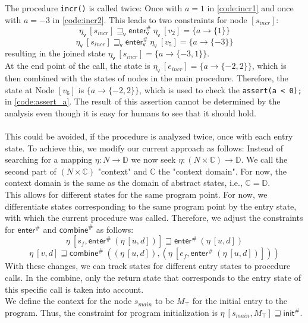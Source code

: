     \noindent The procedure \texttt{incr()} is called twice: Once with $a = 1$ in \autoref{code:incr1} and once with $a = -3$ in \autoref{code:incr2}. This leads to two constraints for node $[s_{incr}]$: 
      \[\eta_\textsf{v}\ [s_{incr}] \sqsupseteq_\textsf{v} \textsf{enter}^{\#}_\textsf{v}\ \eta_\textsf{v}\ [v_2] = \{a \rightarrow \{1\} \} \]
      \[\eta_\textsf{v}\ [s_{incr}] \sqsupseteq_\textsf{v} \textsf{enter}^{\#}_\textsf{v}\ \eta_\textsf{v}\ [v_5] = \{a \rightarrow \{-3\} \} \]
    resulting in the joined state $\eta_\textsf{v}\ [s_{incr}] = \{a \rightarrow \{-3, 1\}\}$.\\
    At the end point of the call, the state is $\eta_\textsf{v}\ [e_{incr}] = \{a \rightarrow \{-2, 2\}\}$, which is then combined with the states of nodes in the main procedure. Therefore, the state at Node $[v_6]$ is $\{a \rightarrow \{-2, 2\}\}$, which is used to check the \texttt{assert(a < 0);} in \autoref{code:assert_a}. The result of this assertion cannot be determined by the analysis even though it is easy for humans to see that it should hold.\\
    \\
    This could be avoided, if the procedure is analyzed twice, once with each entry state. To achieve this, we modify our current approach as follows: Instead of searching for a mapping $\eta: N \rightarrow \mathbb{D}$ we now seek $\eta: (N \times \mathbb{C}) \rightarrow \mathbb{D}$. We call the second part of $(N \times \mathbb{C})$ "context" and $\mathbb{C}$ the "context domain". For now, the context domain is the same as the domain of abstract states, i.e., $\mathbb{C} = \mathbb{D}$.\\
    This allows for different states for the same program point. For now, we differentiate states corresponding to the same program point by the entry state, with which the current procedure was called. Therefore, we adjust the constraints for $\textsf{enter}^{\#}$ and $\textsf{combine}^{\#}$ as follows:
    \[\eta\ [s_f, \textsf{enter}^{\#}\ (\eta\ [u, d])] \sqsupseteq \textsf{enter}^{\#}\ (\eta\ [u, d]) \]
    \[\eta\ [v, d] \sqsupseteq \textsf{combine}^{\#}\ ((\eta\ [u, d]), (\eta\ [e_f, \textsf{enter}^{\#}\ (\eta\ [u, d])])) \]
    With these changes, we can track states for different entry states to procedure calls. In the combine, only the return state that corresponds to the entry state of this specific call is taken into account.\\
    We define the context for the node $s_{main}$ to be $M_\top$ for the initial entry to the program. Thus, the constraint for program initialization is $\eta\ [s_{main}, M_\top] \sqsupseteq \textsf{init}^{\#}$.\\
